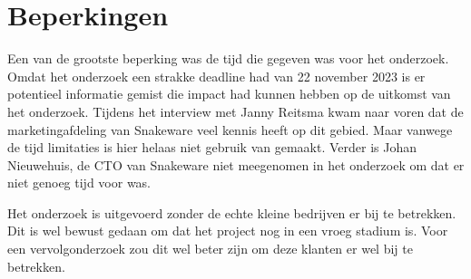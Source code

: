 \section{Beperkingen}
Een van de grootste beperking was de tijd die gegeven was voor het onderzoek.
Omdat het onderzoek een strakke deadline had van 22 november 2023 is er potentieel informatie gemist die impact had kunnen hebben op de uitkomst van het onderzoek.
Tijdens het interview met Janny Reitsma kwam naar voren dat de marketingafdeling van Snakeware veel kennis heeft op dit gebied.
Maar vanwege de tijd limitaties is hier helaas niet gebruik van gemaakt.
Verder is Johan Nieuwehuis, de CTO van Snakeware niet meegenomen in het onderzoek om dat er niet genoeg tijd voor was.

\whitespace
Het onderzoek is uitgevoerd zonder de echte kleine bedrijven er bij te betrekken.
Dit is wel bewust gedaan om dat het project nog in een vroeg stadium is.
Voor een vervolgonderzoek zou dit wel beter zijn om deze klanten er wel bij te betrekken.
